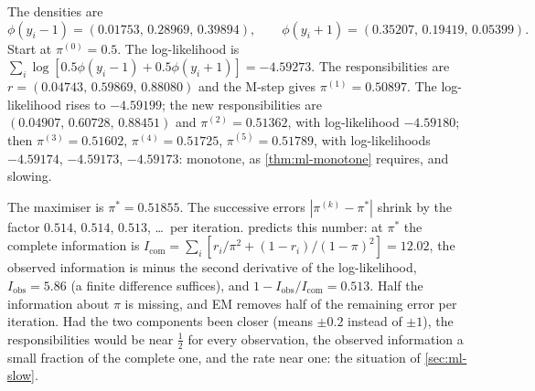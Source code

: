 The densities are
\[
  \phi(y_i-1)=(0.01753,\,0.28969,\,0.39894),\qquad
  \phi(y_i+1)=(0.35207,\,0.19419,\,0.05399).
\]
Start at $\pi^{(0)}=0.5$. The log-likelihood is
$\sum_i\log[0.5\phi(y_i-1)+0.5\phi(y_i+1)]=-4.59273$. The responsibilities are
$r=(0.04743,\,0.59869,\,0.88080)$ and the M-step gives $\pi^{(1)}=0.50897$. The
log-likelihood rises to $-4.59199$; the new responsibilities are
$(0.04907,\,0.60728,\,0.88451)$ and $\pi^{(2)}=0.51362$, with log-likelihood
$-4.59180$; then $\pi^{(3)}=0.51602$,
$\pi^{(4)}=0.51725$, $\pi^{(5)}=0.51789$, with log-likelihoods $-4.59174$, $-4.59173$,
$-4.59173$: monotone, as \cref{thm:ml-monotone} requires, and slowing.

The maximiser is $\pi^\ast=0.51855$. The successive errors $|\pi^{(k)}-\pi^\ast|$ shrink
by the factor $0.514$, $0.514$, $0.513$, \dots\ per iteration. 
predicts this number: at $\pi^\ast$ the complete information is
$I_{\mathrm{com}}=\sum_i[r_i/\pi^2+(1-r_i)/(1-\pi)^2]=12.02$, the observed information is
minus the second derivative of the log-likelihood, $I_{\mathrm{obs}}=5.86$ (a finite
difference suffices), and $1-I_{\mathrm{obs}}/I_{\mathrm{com}}=0.513$. Half the information
about $\pi$ is missing, and EM removes half of the remaining error per iteration. Had
the two components been closer (means $\pm0.2$ instead of $\pm1$), the responsibilities
would be near $\tfrac12$ for every observation, the observed information a small
fraction of the complete one, and the rate near one: the situation of
\cref{sec:ml-slow}.



